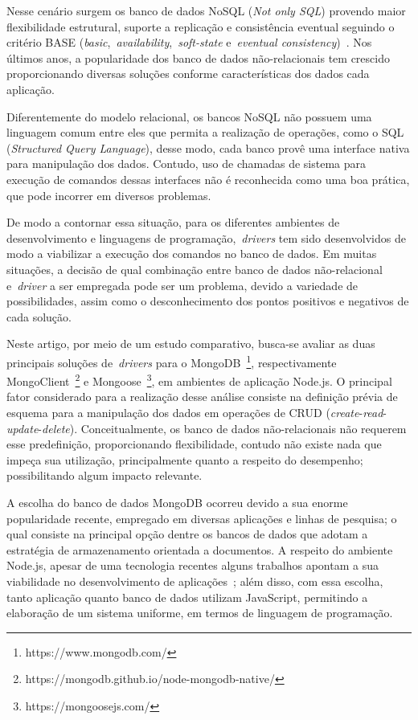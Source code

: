 \documentclass[12pt]{article}
\begin{document}
Nesse cenário surgem os banco de dados NoSQL (\emph{Not only SQL}) provendo maior flexibilidade estrutural, suporte a replicação e consistência eventual seguindo o critério BASE (\textit{basic},~\textit{availability},~\textit{soft-state} e~\textit{eventual consistency})~\cite{han2011survey}. 
Nos últimos anos, a popularidade dos banco de dados não-relacionais tem crescido~\cite{cooper2010benchmarking,edlich2015nosql} proporcionando diversas soluções conforme características dos dados cada aplicação.

Diferentemente do modelo relacional, os bancos NoSQL não possuem uma linguagem comum entre eles que permita a realização de operações, como o SQL (\emph{Structured Query Language}), desse modo, cada banco provê uma interface nativa para manipulação dos dados. 
Contudo, uso de chamadas de sistema para execução de comandos dessas interfaces não é reconhecida como uma boa prática, que pode incorrer em diversos problemas. 

De modo a contornar essa situação, para os diferentes ambientes de desenvolvimento e linguagens de programação,~\emph{drivers} tem sido desenvolvidos de modo a viabilizar a execução dos comandos no banco de dados. 
Em muitas situações, a decisão de qual combinação entre banco de dados não-relacional e~\emph{driver} a ser empregada pode ser um problema, devido a variedade de possibilidades, assim como o desconhecimento dos pontos positivos e negativos de cada solução.

Neste artigo, por meio de um estudo comparativo, busca-se avaliar as duas principais soluções de~\emph{drivers} para o MongoDB~\footnote{https://www.mongodb.com/}, respectivamente MongoClient~\footnote{https://mongodb.github.io/node-mongodb-native/} e Mongoose~\footnote{https://mongoosejs.com/}, em ambientes de aplicação Node.js. 
O principal fator considerado para a realização desse análise consiste na definição prévia de esquema para a manipulação dos dados em operações de CRUD (\emph{create}-\emph{read}-\emph{update}-\emph{delete}). Conceitualmente, os banco de dados não-relacionais não requerem esse predefinição, proporcionando flexibilidade, contudo não existe nada que impeça sua utilização, principalmente quanto a respeito do desempenho; possibilitando algum impacto relevante.

A escolha do banco de dados MongoDB ocorreu devido a sua enorme popularidade recente, empregado em diversas aplicações e linhas de pesquisa; o qual consiste na principal opção dentre os bancos de dados que adotam a estratégia de armazenamento orientada a documentos.
A respeito do ambiente Node.js, apesar de uma tecnologia recentes alguns trabalhos apontam a sua viabilidade no desenvolvimento de aplicações~\cite{chaniotis2015node}; além disso, com essa escolha, tanto aplicação quanto banco de dados utilizam JavaScript, permitindo a elaboração de um sistema uniforme, em termos de linguagem de programação.
\end{document}
